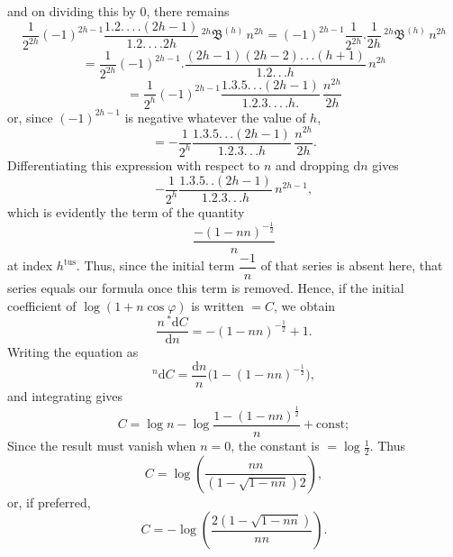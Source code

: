 \par\noindent{}%
and on dividing this by $0$, there remains
\[
\frac{1}{2^{2h}}(-1)^{2h-1}\frac{1.2.\,.\,.\,.(2h-1)}{1.2.\,.\,.\,. 2h}\,{}^{2h}\mathfrak{B}^{(h)}\,n^{2h} = (-1)^{2h-1}\frac{1}{2^{2h}} . \frac{1}{2h}\,{}^{2h}\mathfrak{B}^{(h)}\,n^{2h}
\]
\[
= \frac{1}{2^{2h}}(-1)^{2h-1} . \frac{(2h-1)(2h-2).\,.\,.(h+1)}{1.2.\,.\,. h}\,n^{2h}
\]
\[
= \frac{1}{2^{h}}(-1)^{2h-1}\frac{1.3.5.\,.\,.(2h-1)}{1.2.3.\,.\,.\,. h.}\,\frac{n^{2h}}{2h}
\]
or, since $(-1)^{2h-1}$ is negative whatever the value of $h$,
\[
= -\frac{1}{2^{h}}\frac{1.3.5.\,.\,.(2h-1)}{1.2.3.\,.\,. h}\,\frac{n^{2h}}{2h}.
\]
Differentiating this expression with respect to $n$ and dropping $\mathrm{d}n$ gives
\[
-\frac{1}{2^{h}}\frac{1.3.5.\,.(2h-1)}{1.2.3.\,.\,. h}\,n^{2h-1},
\]
which is evidently the term of the quantity
\[
\frac{-(1-nn)^{-\frac{1}{2}}}{n}
\]
at index $h^{\mathrm{tus}}$. Thus, since the initial term
$\dfrac{-1}{n}$ of that series is absent here, that series equals our formula once this term is removed. Hence, if the
initial coefficient of $\log(1+n\cos\varphi)$ is written $=C$, we obtain
\[
\frac{n\,{}^{*}\!\mathrm{d}C}{\mathrm{d}n} = -(1-nn)^{-\frac{1}{2}}+1.
\]
Writing the equation as
\[
{}^{n}\mathrm{d}C = \frac{\mathrm{d}n}{n}\bigl(1-(1-nn)^{-\frac{1}{2}}\bigr),
\]
and integrating gives
\[
C = \log n - \log\frac{1-(1-nn)^{\frac{1}{2}}}{n} + \mathrm{const};
\]
Since the result must vanish when $n=0$, the constant is $=\log\tfrac{1}{2}$. Thus
\[
C = \log\left(\frac{nn}{(1-\sqrt{1-nn})2}\right),
\]
or, if preferred,
\[
C = -\log\left(\frac{2(1-\sqrt{1-nn})}{nn}\right).
\]

